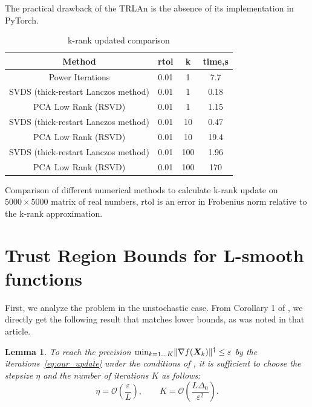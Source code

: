 \documentclass{article} %
\newtheorem{lemma}{Lemma}
\newcommand{\norm}[1]{\lVert #1\rVert}
\renewcommand{\epsilon}{\varepsilon}
\newcommand{\cO}{\mathcal{O}}
\begin{document}
The practical drawback of the TRLAn is the absence of its implementation in PyTorch.
\begin{table}[h!]
    \centering
    \begin{tabular}{c|c|c|c}
    \hline
    Method                              & rtol        & k & time,s \\
    \hline 
    Power Iterations                    & 0.01        & 1 & 7.7\\ 
    SVDS (thick-restart Lanczos method) & 0.01        & 1 & 0.18\\
    PCA Low Rank (RSVD)                 & 0.01        & 1 & 1.15\\
    SVDS (thick-restart Lanczos method) & 0.01        & 10 & 0.47\\
    PCA Low Rank (RSVD)                 & 0.01        & 10 & 19.4\\
    SVDS (thick-restart Lanczos method) & 0.01        & 100 & 1.96\\
    PCA Low Rank (RSVD)                 & 0.01        & 100 & 170\\
    \end{tabular}
    \caption{k-rank updated comparison}
    Comparison of different numerical methods to calculate k-rank update on $5000\times5000$ matrix of real numbers, rtol is an error in Frobenius norm relative to the k-rank approximation. 
    \label{tbl:matrix_methods}
\end{table}
\section{Trust Region Bounds for L-smooth functions}
    First, we analyze the problem in the unstochastic case. From Corollary 1 of \citet{kovalev2025understanding}, we directly get the following result that matches lower bounds, as was noted in that article.


    \begin{lemma}\label{lemma:no_noise_tr}
    To reach the precision $\min_{k=1\ldots K} \norm{\nabla f(\mX_k)}^\dagger \leq \epsilon$ by the iterations~\eqref{eq:our_update} under the conditions of , it is sufficient to choose the stepsize $\eta$ and the number of iterations $K$ as follows:
    \begin{equation}\label{eq:unstoch_tr}
      \eta = \cO\left(\frac{\epsilon}{L}\right),\qquad K = \cO\left(\frac{L\Delta_0}{\epsilon^2}\right).
    \end{equation}
    \end{lemma}
\end{document}
